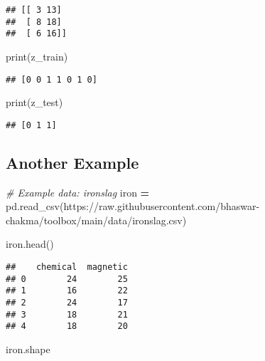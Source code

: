 \documentclass[
]{book}
\newenvironment{Shaded}{\begin{snugshade}}{\end{snugshade}}
\newcommand{\BuiltInTok}[1]{#1}
\newcommand{\CommentTok}[1]{\textcolor[rgb]{0.56,0.35,0.01}{\textit{#1}}}
\newcommand{\NormalTok}[1]{#1}
\newcommand{\OperatorTok}[1]{\textcolor[rgb]{0.81,0.36,0.00}{\textbf{#1}}}
\newcommand{\StringTok}[1]{\textcolor[rgb]{0.31,0.60,0.02}{#1}}
\begin{document}
\begin{verbatim}
## [[ 3 13]
##  [ 8 18]
##  [ 6 16]]
\end{verbatim}

\begin{Shaded}
\begin{Highlighting}[]
\BuiltInTok{print}\NormalTok{(z\_train)}
\end{Highlighting}
\end{Shaded}

\begin{verbatim}
## [0 0 1 1 0 1 0]
\end{verbatim}

\begin{Shaded}
\begin{Highlighting}[]
\BuiltInTok{print}\NormalTok{(z\_test)}
\end{Highlighting}
\end{Shaded}

\begin{verbatim}
## [0 1 1]
\end{verbatim}

\hypertarget{another-example}{%
\subsection{Another Example}\label{another-example}}

\begin{Shaded}
\begin{Highlighting}[]
\CommentTok{\# Example data: ironslag}
\NormalTok{iron }\OperatorTok{=}\NormalTok{ pd.read\_csv(}\StringTok{\textquotesingle{}https://raw.githubusercontent.com/bhaswar{-}chakma/toolbox/main/data/ironslag.csv\textquotesingle{}}\NormalTok{)}
\end{Highlighting}
\end{Shaded}

\begin{Shaded}
\begin{Highlighting}[]
\NormalTok{iron.head()}
\end{Highlighting}
\end{Shaded}

\begin{verbatim}
##    chemical  magnetic
## 0        24        25
## 1        16        22
## 2        24        17
## 3        18        21
## 4        18        20
\end{verbatim}

\begin{Shaded}
\begin{Highlighting}[]
\NormalTok{iron.shape}
\end{Highlighting}
\end{Shaded}
\end{document}
